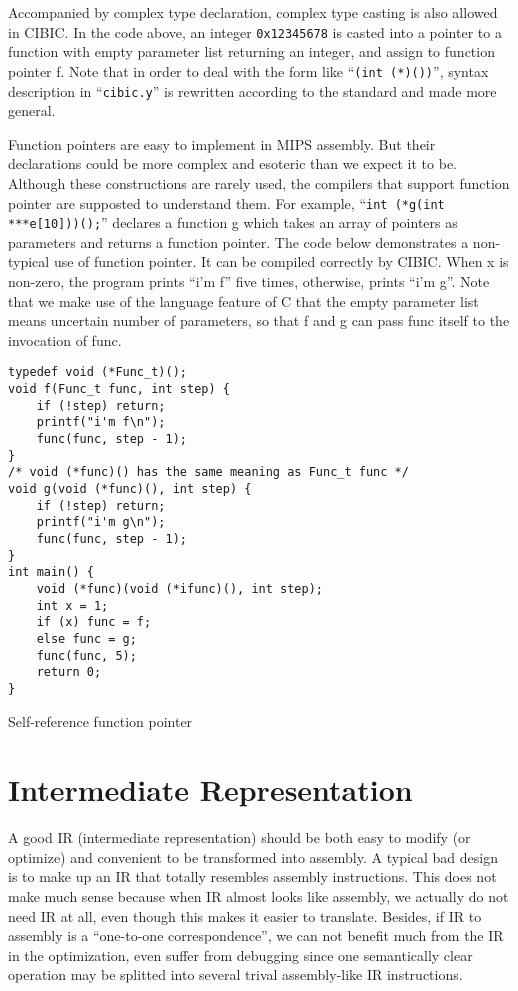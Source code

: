 \documentclass[10pt, a4paper]{article}
\begin{document}
Accompanied by complex type declaration, complex type casting is also allowed in
CIBIC. In the code above, an integer \texttt{0x12345678} is casted into a
pointer to a function with empty parameter list returning an integer, and assign
to function pointer f. Note that in order to deal with the form like
``\texttt{(int (*)())}'', syntax description in ``\texttt{cibic.y}'' is rewritten
according to the standard and made more general.

Function pointers are easy to implement in MIPS assembly. But their declarations
could be more complex and esoteric than we expect it to be. Although these
constructions are rarely used, the compilers that support function pointer are
supposted to understand them. For example, ``\texttt{int (*g(int
***e[10]))();}'' declares a function g which takes an array of pointers as
parameters and returns a function pointer. The code below demonstrates a
non-typical use of function pointer. It can be compiled correctly by CIBIC. When
x is non-zero, the program prints ``i'm f'' five times, otherwise, prints ``i'm
g''. Note that we make use of the language feature of C that the empty parameter
list means uncertain number of parameters, so that f and g can pass func itself
to the invocation of func.
\begin{listing}[H]
    \centering
    \begin{verbatim}
typedef void (*Func_t)();
void f(Func_t func, int step) {
    if (!step) return;
    printf("i'm f\n");
    func(func, step - 1);
}
/* void (*func)() has the same meaning as Func_t func */
void g(void (*func)(), int step) {
    if (!step) return;
    printf("i'm g\n");
    func(func, step - 1);
}
int main() {
    void (*func)(void (*ifunc)(), int step);
    int x = 1;
    if (x) func = f;
    else func = g;
    func(func, 5);
    return 0;
}
    \end{verbatim}
    \caption {Self-reference function pointer}
\end{listing}
\section{Intermediate Representation}
A good IR (intermediate representation) should be both easy to modify (or
optimize) and convenient to be transformed into assembly. A typical bad design
is to make up an IR that totally resembles assembly instructions. This does not
make much sense because when IR almost looks like assembly, we actually do not
need IR at all, even though this makes it easier to translate. Besides, if IR to
assembly is a ``one-to-one correspondence'', we can not benefit much from the IR
in the optimization, even suffer from debugging since one semantically clear
operation may be splitted into several trival assembly-like IR instructions.
\end{document}
